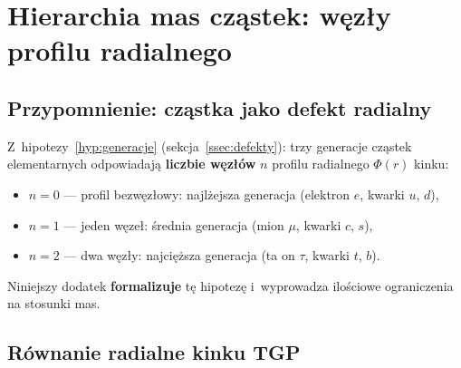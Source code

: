 \section{Hierarchia mas cz\k{a}stek: w\k{e}z\l{}y profilu radialnego}%
\label{app:hierarchia-mas}

\subsection{Przypomnienie: cz\k{a}stka jako defekt radialny}%
\label{app:F-reminder}

Z~hipotezy~\ref{hyp:generacje} (sekcja~\ref{ssec:defekty}):
trzy generacje cz\k{a}stek elementarnych odpowiadaj\k{a}
\textbf{liczbie w\k{e}z\l{}\'ow} $n$ profilu radialnego $\Phi(r)$
kinku:
\begin{itemize}[nosep]
    \item $n = 0$ --- profil bezw\k{e}z\l{}owy: najl\.zejsza
          generacja (elektron $e$, kwarki $u$, $d$),
    \item $n = 1$ --- jeden w\k{e}ze\l{}: \'srednia generacja
          (mion $\mu$, kwarki $c$, $s$),
    \item $n = 2$ --- dwa w\k{e}z\l{}y: najci\k{e}\.zsza generacja
          (ta on $\tau$, kwarki $t$, $b$).
\end{itemize}
Niniejszy dodatek \textbf{formalizuje} t\k{e} hipotez\k{e}
i~wyprowadza ilo\'sciowe ograniczenia na stosunki mas.

\medskip
\noindent{}
\medskip

\subsection{R\'ownanie radialne kinku TGP}%
\label{app:F-radial-eq}


